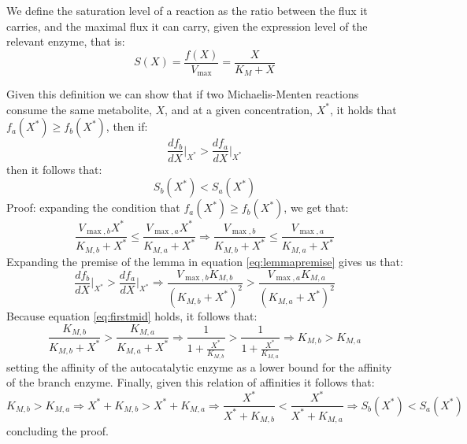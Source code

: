     We define the saturation level of a reaction as the ratio between the flux it carries, and the maximal flux it can carry, given the expression level of the relevant enzyme, that is:
    \begin{equation*}
      S(X)=\frac{f(X)}{V_{\max}}=\frac{X}{K_M+X}
    \end{equation*}

    Given this definition we can show that if two Michaelis-Menten reactions consume the same metabolite, $X$, and at a given concentration, $X^*$, it holds that $f_a(X^*)\geq f_b(X^*)$, then if:
    \begin{equation}
        \frac{df_b}{dX}\Big\vert_{X^*}>\frac{df_a}{dX}\Big\vert_{X^*}
        \label{eq:lemmapremise}
    \end{equation}
    then it follows that:
    \begin{equation*}
        S_b(X^*)<S_a(X^*)
    \end{equation*}
    Proof: expanding the condition that $f_a(X^*)\geq f_b(X^*)$, we get that:
    \begin{equation}
        \frac{V_{\max,b}X^*}{K_{M,b}+X^*}\leq\frac{V_{\max,a}X^*}{K_{M,a}+X^*} \Rightarrow
         \frac{V_{\max,b}}{K_{M,b}+X^*}\leq\frac{V_{\max,a}}{K_{M,a}+X^*}
         \label{eq:firstmid}
     \end{equation}
     Expanding the premise of the lemma in equation \ref{eq:lemmapremise} gives us that:
     \begin{equation*}
        \frac{df_b}{dX}\Big\vert_{X^*}>\frac{df_a}{dX}\Big\vert_{X^*} \Rightarrow
        \frac{V_{\max,b}K_{M,b}}{(K_{M,b}+X^*)^2} > \frac{V_{\max,a}K_{M,a}}{(K_{M,a}+X^*)^2}
     \end{equation*}
     Because equation \ref{eq:firstmid} holds, it follows that:
     \begin{equation*}
         \frac{K_{M,b}}{K_{M,b}+X^*} > \frac{K_{M,a}}{K_{M,a}+X^*} \Rightarrow \frac{1}{1+\frac{X^*}{K_{M,b}}} > \frac{1}{1+\frac{X^*}{K_{M,a}}} \Rightarrow K_{M,b}>K_{M,a}
     \end{equation*}
    setting the affinity of the autocatalytic enzyme as a lower bound for the affinity of the branch enzyme.
    Finally, given this relation of affinities it follows that:
    \begin{equation*}
        K_{M,b}>K_{M,a} \Rightarrow X^*+K_{M,b}>X^*+K_{M,a} \Rightarrow \frac{X^*}{X^*+K_{M,b}}<\frac{X^*}{X^*+K_{M,a} } \Rightarrow S_b(X^*)<S_a(X^*)
    \end{equation*}
    concluding the proof.

